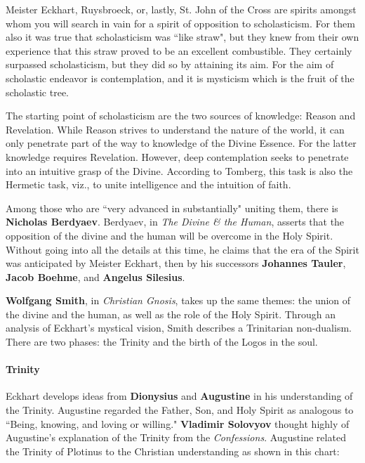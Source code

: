\begin{quotex}
Meister Eckhart, Ruysbroeck, or, lastly, St. John of the Cross are spirits amongst whom you will search in vain for a spirit of opposition to scholasticism. For them also it was true that scholasticism was ``like straw", but they knew from their own experience that this straw proved to be an excellent combustible. They certainly surpassed scholasticism, but they did so by attaining its aim. For the aim of scholastic endeavor is contemplation, and it is mysticism which is the fruit of the scholastic tree. 

\end{quotex}
The starting point of scholasticism are the two sources of knowledge: Reason and Revelation. While Reason strives to understand the nature of the world, it can only penetrate part of the way to knowledge of the Divine Essence. For the latter knowledge requires Revelation. However, deep contemplation seeks to penetrate into an intuitive grasp of the Divine. According to Tomberg, this task is also the Hermetic task, viz., to unite intelligence and the intuition of faith.

Among those who are ``very advanced in substantially" uniting them, there is \textbf{Nicholas Berdyaev}. Berdyaev, in \emph{The Divine \& the Human}, asserts that the opposition of the divine and the human will be overcome in the Holy Spirit. Without going into all the details at this time, he claims that the era of the Spirit was anticipated by Meister Eckhart, then by his successors \textbf{Johannes Tauler}, \textbf{Jacob Boehme}, and \textbf{Angelus Silesius}.

\textbf{Wolfgang Smith}, in \emph{Christian Gnosis}, takes up the same themes: the union of the divine and the human, as well as the role of the Holy Spirit. Through an analysis of Eckhart's mystical vision, Smith describes a Trinitarian non-dualism. There are two phases: the Trinity and the birth of the Logos in the soul.

\paragraph{Trinity}
Eckhart develops ideas from \textbf{Dionysius} and \textbf{Augustine} in his understanding of the Trinity. Augustine regarded the Father, Son, and Holy Spirit as analogous to ``Being, knowing, and loving or willing." \textbf{Vladimir Solovyov} thought highly of Augustine's explanation of the Trinity from the \emph{Confessions}. Augustine related the Trinity of Plotinus to the Christian understanding as shown in this chart:

